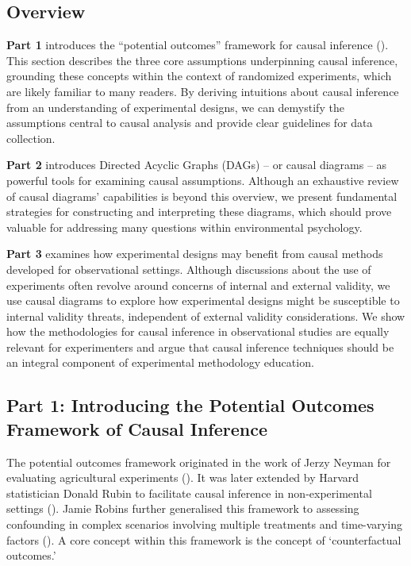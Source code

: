 \documentclass[
  singlecolumn]{article}
\begin{document}
\subsection{Overview}\label{overview}

\textbf{Part 1} introduces the ``potential outcomes'' framework for
causal inference ().
This section describes the three core assumptions underpinning causal
inference, grounding these concepts within the context of randomized
experiments, which are likely familiar to many readers. By deriving
intuitions about causal inference from an understanding of experimental
designs, we can demystify the assumptions central to causal analysis and
provide clear guidelines for data collection.

\textbf{Part 2} introduces Directed Acyclic Graphs (DAGs) -- or causal
diagrams -- as powerful tools for examining causal assumptions. Although
an exhaustive review of causal diagrams' capabilities is beyond this
overview, we present fundamental strategies for constructing and
interpreting these diagrams, which should prove valuable for addressing
many questions within environmental psychology.

\textbf{Part 3} examines how experimental designs may benefit from
causal methods developed for observational settings. Although
discussions about the use of experiments often revolve around concerns
of internal and external validity, we use causal diagrams to explore how
experimental designs might be susceptible to internal validity threats,
independent of external validity considerations. We show how the
methodologies for causal inference in observational studies are equally
relevant for experimenters and argue that causal inference techniques
should be an integral component of experimental methodology education.

\subsection{Part 1: Introducing the Potential Outcomes Framework of
Causal
Inference}\label{part-1-introducing-the-potential-outcomes-framework-of-causal-inference}

The potential outcomes framework originated in the work of Jerzy Neyman
for evaluating agricultural experiments
(). It was later extended by
Harvard statistician Donald Rubin to facilitate causal inference in
non-experimental settings (). Jamie
Robins further generalised this framework to assessing confounding in
complex scenarios involving multiple treatments and time-varying factors
(). A core concept within this
framework is the concept of `counterfactual outcomes.'
\end{document}
